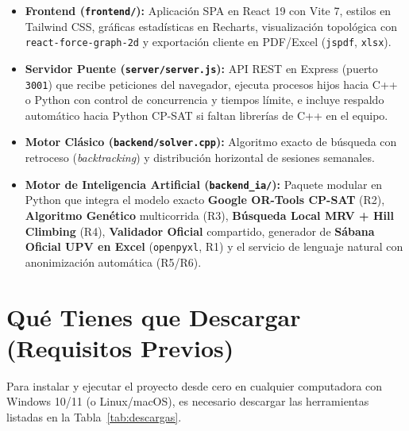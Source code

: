 \documentclass[11pt,letterpaper]{article}
\newcommand{\seccionUPV}[1]{%
    \section{\texorpdfstring{\textcolor{upvmorado}{#1}}{#1}}%
    \vspace{-0.22cm}{\color{upvnaranja}\rule{\textwidth}{1.1pt}}\vspace{0.12cm}%
}
\begin{document}
\begin{itemize}
    \item \textbf{Frontend (\texttt{frontend/}):} Aplicación SPA en React 19 con Vite 7, estilos en Tailwind CSS, gráficas estadísticas en Recharts, visualización topológica con \texttt{react-force-graph-2d} y exportación cliente en PDF/Excel (\texttt{jspdf}, \texttt{xlsx}).
    \item \textbf{Servidor Puente (\texttt{server/server.js}):} API REST en Express (puerto \texttt{3001}) que recibe peticiones del navegador, ejecuta procesos hijos hacia C++ o Python con control de concurrencia y tiempos límite, e incluye respaldo automático hacia Python CP-SAT si faltan librerías de C++ en el equipo.
    \item \textbf{Motor Clásico (\texttt{backend/solver.cpp}):} Algoritmo exacto de búsqueda con retroceso (\textit{backtracking}) y distribución horizontal de sesiones semanales.
    \item \textbf{Motor de Inteligencia Artificial (\texttt{backend\_ia/}):} Paquete modular en Python que integra el modelo exacto \textbf{Google OR-Tools CP-SAT} (R2), \textbf{Algoritmo Genético} multicorrida (R3), \textbf{Búsqueda Local MRV + Hill Climbing} (R4), \textbf{Validador Oficial} compartido, generador de \textbf{Sábana Oficial UPV en Excel} (\texttt{openpyxl}, R1) y el servicio de lenguaje natural con anonimización automática (R5/R6).
\end{itemize}

\seccionUPV{Qué Tienes que Descargar (Requisitos Previos)}

Para instalar y ejecutar el proyecto desde cero en cualquier computadora con Windows 10/11 (o Linux/macOS), es necesario descargar las herramientas listadas en la Tabla~\ref{tab:descargas}.
\end{document}
